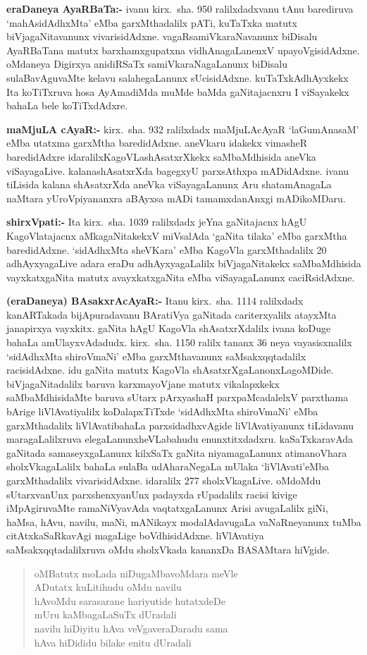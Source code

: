 \textbf{eraDaneya AyaRBaTa:-} ivanu kirx.~sha. {\rm 950} ralilxdadxvanu tAnu barediruva `mahAsidAdhxMta' eMba garxMthadalilx pATi, kuTaTxka matutx biVjagaNitavanunx vivarisidAdxne. vagaRsamiVkaraNavanunx biDisalu AyaRBaTana matutx barxhamxgupatxna vidhAnagaLanenxV upayoVgisidAdxne. oMdaneya Digirxya anidiRSaTx samiVkaraNagaLanunx biDisalu sulaBavAguvaMte kelavu salahegaLanunx sUcisidAdxne. kuTaTxkAdhAyxkekx Ita koTiTxruva hosa AyAmadiMda muMde baMda gaNitajacnxru I viSayakekx bahaLa bele koTiTxdAdxre.

\textbf{maMjuLA cAyaR:-} kirx.~sha. {\rm 932} ralilxdadx maMjuLAcAyaR `laGumAnasaM' eMba utatxma garxMtha baredidAdxne. aneVkaru idakekx vimasheR baredidAdxre idaralilx\break KagoVLashAsatxrXkekx saMbaMdhisida aneVka viSayagaLive. kalanashAsatxrXda bagegxyU parxsAthxpa mADidAdxne. ivanu tiLisida kalana shAsatxrXda aneVka viSayagaLanunx Aru shatamAnagaLa naMtara yUroVpiyananxra aBAyxsa mADi tamamxdanAnxgi mADikoMDaru. 

\textbf{shirxVpati:-} Ita kirx.~sha. {\rm 1039} ralilxdadx jeYna gaNitajacnx hAgU KagoVlatajacnx aMka\-gaNitakekxV miVsalAda `gaNita tilaka' eMba garxMtha baredidAdxne. `sidAdhxMta sheVKara' eMba KagoVla garxMthadalilx {\rm 20} adhAyxyagaLive adara eraDu adhAyxyagaLalilx biVjagaNitakekx saMbaMdhisida vayxkatxgaNita matutx avayxkatxgaNita eMba viSayagaLanunx caciRsidAdxne.

\textbf{(eraDaneya) BAsakxrAcAyaR:-} Itanu kirx.~sha. {\rm 1114} ralilxdadx kanARTakada bijApura\-davanu BAratiVya gaNitada cariterxyalilx atayxMta janapirxya vayxkitx. gaNita hAgU KagoVla shAsatxrXdalilx ivana koDuge bahaLa amUlayxvAdadudx. kirx.~sha. {\rm 1150} ralilx tananx {\rm 36} neya vayasisxnalilx `sidAdhxMta shiroVmaNi' eMba garxMthavanunx saMsakxqqtadalilx racisidAdxne. idu gaNita matutx KagoVla shAsatxrXgaLanonxLagoMDide. biVjagaNitadalilx baruva karxma\-yoVjane matutx vikalapxkekx saMbaMdhisidaMte baruva sUtarx pArxyashaH parxpaMcadalelxV parxthama bArige liVlAvatiyalilx koDalapxTiTxde `sidAdhxMta shiroVmaNi' eMba garxMthadalilx liVlAvati\break bahaLa parxsidadhxvAgide liVlAvatiyanunx tiLidavanu maragaLalilxruva elegaLanunx\break heVLabahudu enunxtitxdadxru. kaSaTxkaravAda gaNitada samaseyxgaLanunx kilxSaTx gaNita niyama\-gaLanunx atimanoVhara sholxVkagaLalilx bahaLa sulaBa udAharaNegaLa mUlaka `liVlAvati'\break eMba garxMthadalilx vivarisidAdxne. idaralilx {\rm 277} sholxVkagaLive. oMdoMdu sUtarxvanUnx parxshenxyanUnx padayxda rUpadalilx racisi kivige iMpAgiruvaMte ramaNiVyavAda vaqtatx\-gaLanunx Arisi avugaLalilx giNi, haMsa, hAvu, navilu, maNi, mANikayx \-modalAdavugaLa vaNaRneyanunx tuMba citAtxkaSaRkavAgi magaLige boVdhisidAdxne. liVlAvatiya saMsakxqqta\-dalilxruva oMdu sholxVkada kananxDa BASAMtara hiVgide.
\begin{verse}
oMBatutx moLada niDugaMbavoMdara meVle\\
ADutatx kuLitihudu oMdu navilu\\
hAvoMdu sarasarane hariyutide hutatxdeDe\\
mUru kaMbagaLaSuTx dUradali\\
navilu hiDiyitu hAva veVgaveraDaradu sama\\
hAva hiDididu bilake enitu dUradali
\end{verse}

